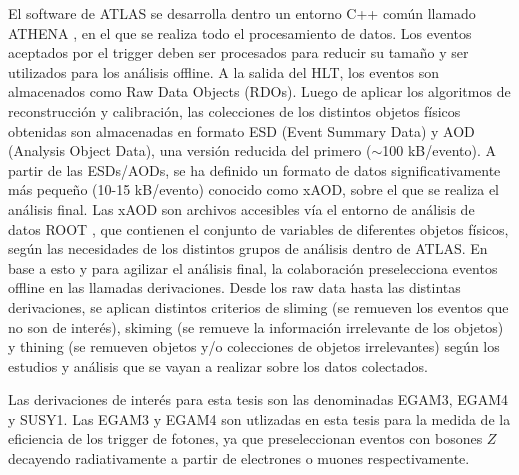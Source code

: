 El software de ATLAS se desarrolla dentro un entorno C++ común llamado ATHENA \cite{ATLAS-TDR-17, analysistools, athena}, en el que se realiza todo el procesamiento de datos. Los eventos aceptados por el trigger deben ser procesados para reducir su tamaño y ser utilizados para los análisis offline. A la salida del HLT, los eventos son almacenados como Raw Data Objects (RDOs). Luego de aplicar los algoritmos de reconstrucción y calibración, las colecciones de los distintos objetos físicos obtenidas son almacenadas en formato ESD (Event Summary Data) y AOD (Analysis Object Data), una versión reducida del primero ($\sim$100 kB/evento). A partir de las ESDs/AODs, se ha definido un formato de datos significativamente más pequeño (10-15 kB/evento) conocido como xAOD, sobre el que se realiza el análisis final. Las xAOD son archivos accesibles vía el entorno de análisis de datos ROOT \cite{root}, que contienen el conjunto de variables de diferentes objetos físicos, según las necesidades de los distintos grupos de análisis dentro de ATLAS. En base a esto y para agilizar el análisis final, la colaboración preselecciona eventos offline en las llamadas derivaciones. Desde los raw data hasta las distintas derivaciones, se aplican distintos criterios de sliming (se remueven los eventos que no son de interés), skiming (se remueve la información irrelevante de los objetos) y thining (se remueven objetos y/o colecciones de objetos irrelevantes) según los estudios y análisis que se vayan a realizar sobre los datos colectados.

Las derivaciones de interés para esta tesis son las denominadas EGAM3, EGAM4 y SUSY1. Las EGAM3 y EGAM4 son utlizadas en esta tesis para la medida de la eficiencia de los trigger de fotones, ya que preseleccionan eventos con bosones $Z$ decayendo radiativamente a partir de electrones o muones respectivamente. 





